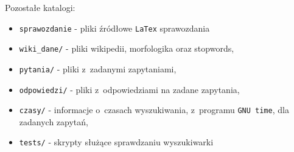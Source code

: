 \documentclass[a4paper,12pt]{article}
\begin{document}
\noindent
Pozostałe katalogi:
\begin{itemize}
	\item \texttt{sprawozdanie} - pliki źródłowe \texttt{LaTex} sprawozdania
	\item \texttt{wiki\_dane/} - pliki wikipedii, morfologika oraz stopwords,
	\item \texttt{pytania/} - pliki z~zadanymi zapytaniami,
	\item \texttt{odpowiedzi/} - pliki z~odpowiedziami na zadane zapytania,
	\item \texttt{czasy/} - informacje o~czasach wyszukiwania, z~programu
		\texttt{GNU time}, dla zadanych zapytań,
	\item \texttt{tests/} - skrypty służące sprawdzaniu wyszukiwarki
\end{itemize}
\end{document}
